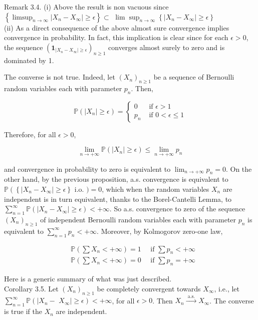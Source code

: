 \documentclass[11pt]{amsbook}
\theoremstyle{plain}%
\theoremstyle{definition}
\theoremstyle{remark}
\begin{document}
Remark 3.4. (i) Above the result is non vacuous since $\left\{\limsup _{n \rightarrow \infty}\left|X_{n}-X_{\infty}\right| \geq \epsilon\right\} \subset$ $\lim \sup _{n \rightarrow \infty}\left\{\left|X_{n}-X_{\infty}\right| \geq \epsilon\right\}$\\

(ii) As a direct consequence of the above almost sure convergence implies convergence in probability. In fact, this implication is clear since for each $\epsilon>0$, the sequence $\left(\mathbf{1}_{\left|X_{n}-X_{\infty}\right| \geq \epsilon}\right)_{n \geq 1}$ converges almost surely to zero and is dominated by 1.

The converse is not true. Indeed, let $\left(X_{n}\right)_{n \geq 1}$ be a sequence of Bernoulli random variables each with parameter $p_{n}$. Then,

$$
\mathbb{P}\left(\left|X_{n}\right| \geq \epsilon\right)= \begin{cases}0 & \text { if } \epsilon>1 \\ p_{n} & \text { if } 0<\epsilon \leq 1\end{cases}
$$

Therefore, for all $\epsilon>0$,

$$
\lim _{n \rightarrow+\infty} \mathbb{P}\left(\left|X_{n}\right| \geq \epsilon\right) \leq \lim _{n \rightarrow+\infty} p_{n}
$$

and convergence in probability to zero is equivalent to $\lim _{n \rightarrow+\infty} p_{n}=0$. On the other hand, by the previous proposition, a.s. convergence is equivalent to $\mathbb{P}\left(\left\{\left|X_{n}-X_{\infty}\right| \geq \epsilon\right\}\right.$ i.o. $)=0$, which when the random variables $X_{n}$ are independent is in turn equivalent, thanks to the Borel-Cantelli Lemma, to $\sum_{n=1}^{\infty} \mathbb{P}\left(\left|X_{n}-X_{\infty}\right| \geq \epsilon\right)<+\infty$. So a.s. convergence to zero of the sequence $\left(X_{n}\right)_{n \geq 1}$ of independent Bernoulli random variables each with parameter $p_{n}$ is equivalent to $\sum_{n=1}^{\infty} p_{n}<+\infty$. Moreover, by Kolmogorov zero-one law,

$$
\begin{aligned}
& \mathbb{P}\left(\sum X_{n}<+\infty\right)=1 \quad \text { if } \sum p_{n}<+\infty \\
& \mathbb{P}\left(\sum X_{n}<+\infty\right)=0 \quad \text { if } \sum p_{n}=+\infty
\end{aligned}
$$

Here is a generic summary of what was just described.\\
Corollary 3.5. Let $\left(X_{n}\right)_{n \geq 1}$ be completely convergent towards $X_{\infty}$, i.e., let $\sum_{n=1}^{\infty} \mathbb{P}\left(\mid X_{n}-\right.$ $\left.X_{\infty} \mid \geq \epsilon\right)<+\infty$, for all $\epsilon>0$. Then $X_{n} \xrightarrow{\text { a.s. }} X_{\infty}$. The converse is true if the $X_{n}$ are independent.
\end{document}
